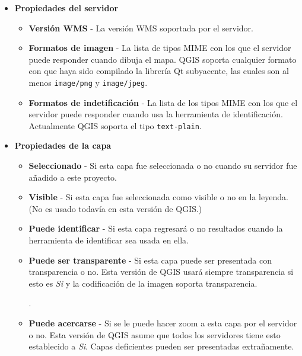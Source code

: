 \begin{itemize}
\item \textbf{Propiedades del servidor}

\begin{itemize}
\item \textbf{Versión WMS}      - La versión WMS soportada por el servidor.

\item \textbf{Formatos de imagen}    - La lista de tipos MIME con los que el servidor puede responder cuando dibuja el mapa.  QGIS soporta cualquier formato con que haya sido compilado la librería Qt subyacente, las cuales son al menos \texttt{image/png} y \texttt{image/jpeg}.

\item \textbf{Formatos de indetificación} - La lista de los tipos MIME con los que el servidor puede responder cuando usa la herramienta de identificación.  Actualmente QGIS soporta el tipo  \texttt{text-plain}.

\end{itemize}

\item \textbf{Propiedades de la capa}

\begin{itemize}
\item \textbf{Seleccionado}         - Si esta capa fue seleccionada o no cuando su servidor fue añadido a este proyecto.

\item \textbf{Visible}          - Si esta capa fue seleccionada como visible o no en la leyenda.  (No es usado todavía en esta versión de QGIS.)

\item \textbf{Puede identificar}     - Si esta capa regresará o no resultados cuando la herramienta de identificar sea usada en ella.

\item \textbf{Puede ser transparente} - Si esta capa puede ser presentada con transparencia  o no. Esta versión de QGIS usará siempre transparencia si esto es \textsl{Si} y la codificación de la imagen soporta transparencia.

                                    .

\item \textbf{Puede acercarse}      - Si se le puede hacer zoom a esta capa por el servidor o no. Esta versión de QGIS asume que todos los servidores tiene esto establecido a \textsl{Si}. Capas deficientes pueden ser presentadas extrañamente.


\end{itemize}
\end{itemize}
